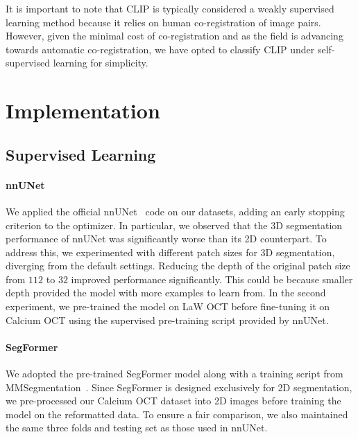 \documentclass[a4paper,11pt,oneside]{report}
\begin{document}
It is important to note that CLIP is typically considered a weakly supervised learning method because it relies on human co-registration of image pairs. However, given the minimal cost of co-registration and as the field is advancing towards automatic co-registration, we have opted to classify CLIP under self-supervised learning for simplicity. 

\chapter{Implementation}


\section{Supervised Learning}
\subsubsection{nnUNet}
We applied the official nnUNet~\cite{Isensee2020} code on our datasets, adding an early stopping criterion to the optimizer. In particular, we observed that the 3D segmentation performance of nnUNet was significantly worse than its 2D counterpart. To address this, we experimented with different patch sizes for 3D segmentation, diverging from the default settings. Reducing the depth of the original patch size from $112$ to $32$ improved performance significantly. This could be because smaller depth provided the model with more examples to learn from. In the second experiment, we pre-trained the model on LaW OCT before fine-tuning it on Calcium OCT using the supervised pre-training script provided by nnUNet.

\subsubsection{SegFormer}\label{sec:implementation:segformer}
We adopted the pre-trained SegFormer model along with a training script from MMSegmentation~\cite{mmseg2020}. Since SegFormer is designed exclusively for 2D segmentation, we pre-processed our Calcium OCT dataset into 2D images before training the model on the reformatted data. To ensure a fair comparison, we also maintained the same three folds and testing set as those used in nnUNet.
\end{document}
